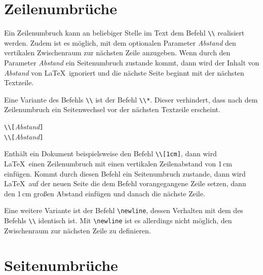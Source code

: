 \documentclass[a4paper,10pt,twoside]{scrbook}
\begin{document}

\section{Zeilenumbrüche}

Ein Zeilenumbruch 
kann an beliebiger Stelle im Text dem
Befehl \verb!\\!\index[cmd]{\texttt{\textbackslash\textbackslash}} realisiert werden. Zudem ist es möglich, mit dem 
optionalen Parameter \textsl{Abstand} den vertikalen Zwischenraum zur nächsten Zeile anzugeben. Wenn durch
den Parameter \textsl{Abstand} ein Seitenumbruch zustande kommt, dann wird 
der Inhalt von \textsl{Abstand} von \LaTeX\ ignoriert und die nächste Seite 
beginnt mit der nächsten Textzeile. 


Eine Variante des Befehls \verb!\\! ist der Befehl 
\verb!\\*!. Dieser verhindert, dass nach
dem Zeilenumbruch ein Seitenwechsel 
vor der nächsten Textzeile erscheint.


\begin{boxedminipage}{\textwidth}
	\texttt{\textbackslash \textbackslash[}\textsl{Abstand}\texttt{]} \\
	\texttt{\textbackslash \textbackslash*[}\textsl{Abstand}\texttt{]} 
\end{boxedminipage}


Enthält ein Dokument beispielsweise den Befehl 
\verb!\\[1cm]!, dann wird \LaTeX\ einen Zeilenumbruch 
mit einen vertikalen Zeilenabstand von 1\,cm 
einfügen. Kommt durch diesen  Befehl ein 
Seitenumbruch zustande, dann 
wird \LaTeX\ auf der neuen Seite die 
dem Befehl vorangegangene Zeile 
setzen, dann den 1\,cm großen Abstand einfügen und danach die nächste Zeile. 


Eine weitere Variante ist der 
Befehl \verb!\newline!, 
dessen Verhalten mit dem des Befehls \verb!\\! identisch ist. 
Mit \verb!\newline! ist es allerdings nicht möglich, den 
Zwischenraum zur nächsten Zeile zu definieren.






\section{Seitenumbrüche}
\end{document}
